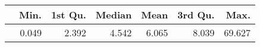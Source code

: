 \begin{table}[ht]
\centering
\begin{tabular}{rrrrrrr}
  \hline
 & Min. & 1st Qu. & Median & Mean & 3rd Qu. & Max. \\ 
  \hline
 & 0.049 & 2.392 & 4.542 & 6.065 & 8.039 & 69.627 \\ 
   \hline
\end{tabular}
\end{table}
